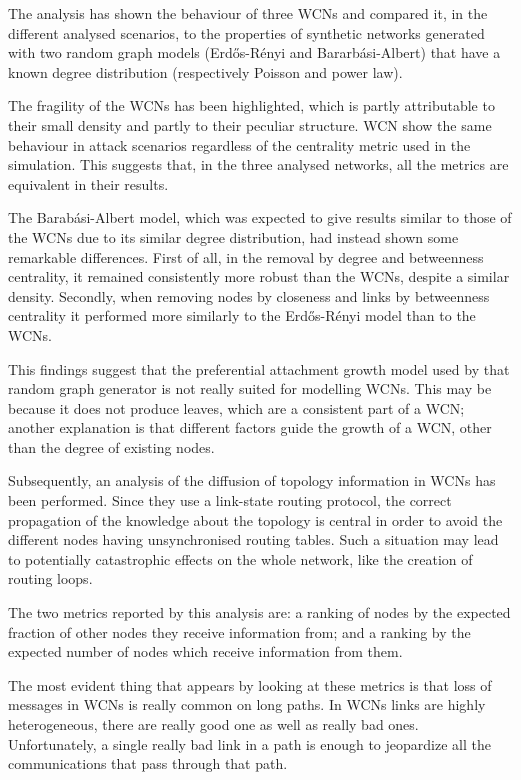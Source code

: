 \documentclass[oneside,openany]{memoir}
\begin{document}
The analysis has shown the behaviour of three WCNs and compared it, in the
different analysed scenarios, to the properties of synthetic networks
generated with two random graph models (Erd\H{o}s-Rényi and Bararbási-Albert)
that have a known degree distribution (respectively Poisson and power law).

The fragility of the WCNs has been highlighted, which is partly attributable
to their small density and partly to their peculiar structure. WCN show the
same behaviour in attack scenarios regardless of the centrality metric used
in the simulation. This suggests that, in the three analysed
networks, all the metrics are equivalent in their results.

The Barabási-Albert model, which was expected to give results similar to
those of the WCNs due to its similar degree distribution, had instead shown
some remarkable differences. First of all, in the removal by degree and
betweenness centrality, it remained consistently more robust than the WCNs,
despite a similar density. Secondly, when removing nodes by closeness and
links by betweenness centrality it performed more similarly to the
Erd\H{o}s-Rényi model than to the WCNs.

This findings suggest that the preferential attachment growth model used by
that random graph generator is not really suited for modelling WCNs.
This may be because it does not produce leaves, which are a consistent part
of a WCN; another explanation is that different factors guide the growth of
a WCN, other than the degree of existing nodes.

Subsequently, an analysis of the diffusion of topology information in WCNs
has been performed. Since they use a link-state routing protocol, the correct
propagation of the knowledge about the topology is central in order to avoid
the different nodes having unsynchronised routing tables. Such a situation
may lead to potentially catastrophic effects on the whole network, like the
creation of routing loops.

The two metrics reported by this analysis are: a ranking of nodes by the expected
fraction of other nodes they receive information from; and a ranking by the
expected number of nodes which receive information from them.

The most evident thing that appears by looking at these metrics is that loss
of messages in WCNs is really common on long paths. In WCNs links are highly
heterogeneous, there are really good one as well as really bad ones.
Unfortunately, a single really bad link in a path is enough to jeopardize
all the communications that pass through that path.
\end{document}
